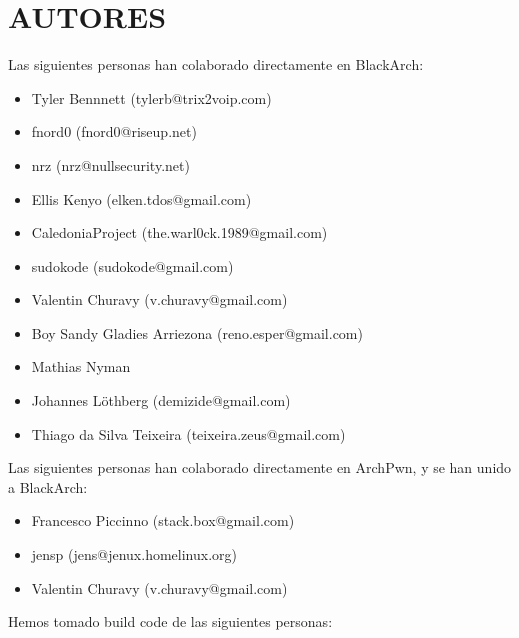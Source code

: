 \section{AUTORES}
Las siguientes personas han colaborado directamente en BlackArch:
\begin{itemize}
\item Tyler Bennnett (tylerb@trix2voip.com)
\item fnord0 (fnord0@riseup.net)
\item nrz (nrz@nullsecurity.net)
\item Ellis Kenyo (elken.tdos@gmail.com)
\item CaledoniaProject (the.warl0ck.1989@gmail.com)
\item sudokode (sudokode@gmail.com)
\item Valentin Churavy (v.churavy@gmail.com)
\item Boy Sandy Gladies Arriezona (reno.esper@gmail.com)
\item Mathias Nyman
\item Johannes Löthberg (demizide@gmail.com)
\item Thiago da Silva Teixeira (teixeira.zeus@gmail.com)
\end{itemize}
Las siguientes personas han colaborado directamente en ArchPwn, 
y se han unido a BlackArch:
\begin{itemize}
\item Francesco Piccinno (stack.box@gmail.com)
\item jensp (jens@jenux.homelinux.org)
\item Valentin Churavy (v.churavy@gmail.com)
\end{itemize}
Hemos tomado build code de las siguientes personas:
